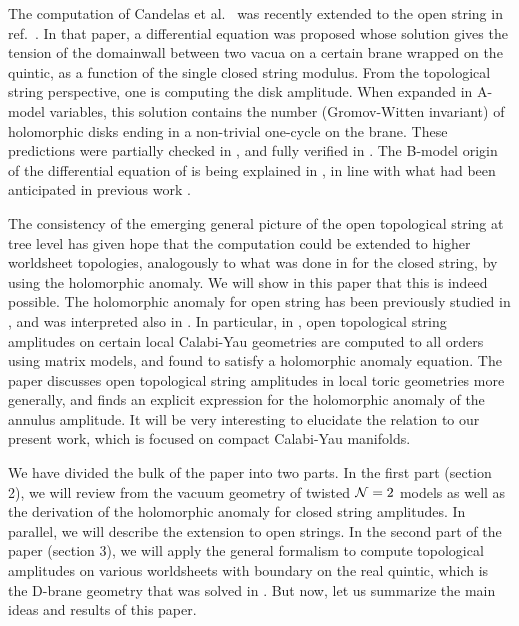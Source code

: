 The computation of Candelas et al.\ \cite{cdgp} was recently extended 
to the open string in ref.\ \cite{open}. In that paper, a differential
equation was proposed whose solution gives the tension of the 
domainwall between two vacua on a certain brane wrapped on the quintic,
as a function of the single closed string modulus. From the topological
string perspective, one is computing the disk amplitude. When expanded 
in A-model variables, this solution contains the number (Gromov-Witten
invariant) of holomorphic disks ending in a non-trivial one-cycle on 
the brane. These predictions were partially checked in \cite{open}, and 
fully verified in \cite{psw}. The B-model origin of the differential 
equation of \cite{open} is being explained in \cite{mowa}, in line with
what had been anticipated in previous work \cite{lmw}.

The consistency of the emerging general picture of the open topological
string at tree level has given hope that the computation could be 
extended to higher worldsheet topologies, analogously to what was 
done in \cite{bcov1,bcov2} for the closed string, by using the 
holomorphic anomaly. We will show in this paper that this is indeed 
possible. The holomorphic anomaly for open string has been previously
studied in \cite{bcov2,agnt2,marcos1,eynard}, and was interpreted 
also in \cite{integrable,anv}. In particular, in \cite{eynard}, open 
topological string amplitudes on certain local Calabi-Yau geometries 
are computed to all orders using matrix models, and found to satisfy a 
holomorphic anomaly equation. The paper \cite{marcos1} discusses open 
topological string amplitudes in local toric geometries more generally, 
and finds an explicit expression for the holomorphic anomaly of the 
annulus amplitude. It will be very interesting to elucidate the relation 
to our present work, which is focused on compact Calabi-Yau manifolds.

We have divided the bulk of the paper into two parts. In the first part
(section 2), we will review from \cite{bcov2} the vacuum geometry of 
twisted ${\cal N}=2$ models as well as the derivation of the holomorphic 
anomaly for closed string amplitudes. In parallel, we will describe 
the extension to open strings. In the second part of the paper (section 3), 
we will apply the general formalism to compute topological amplitudes 
on various worldsheets with boundary on the real quintic, which is the 
D-brane geometry that was solved in \cite{open}. But now, let us 
summarize the main ideas and results of this paper.

